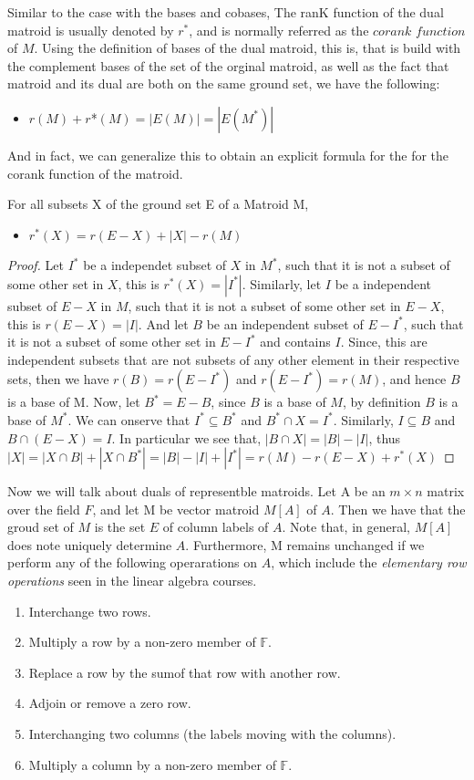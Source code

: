 Similar to the case with the bases and cobases, The ranK function of the dual matroid is usually denoted by $r^*$, and is normally referred as the $corank$ $function$ of $M$. Using the definition of bases of the dual matroid, this is, that is build with the complement bases of the set of the orginal matroid, as well as the fact that matroid and its dual are both on the same ground set, we have the following:

\begin{itemize}
    \item $r(M) + r$*$(M) = |E(M)|=|E(M^*)|$
\end{itemize}

And in fact, we can generalize this to obtain an explicit formula for the for the corank function of the matroid. 

For all subsets X of the ground set E of a Matroid M,
\begin{itemize}
    \item $r^*(X)=r(E-X)+|X|-r(M)$
\end{itemize}

\begin{proof}
    Let $I^*$ be a independet subset of $X$ in $M^*$, such that it is not a subset of some other set in $X$, this is $r^*(X)=|I^*|$. Similarly, let $I$ be a independent subset of $E-X$ in $M$, such that it is not a subset of some other set in $E-X$, this is $r(E-X)=|I|$. And let $B$ be an independent subset of $E-I^*$, such that it is not a subset of some other set in $E-I^*$ and contains $I$. Since, this are independent subsets that are not subsets of any other element in their respective sets, then we have $r(B)=r(E-I^*)$ and $r(E-I^*)=r(M)$, and hence $B$ is a base of M.
    Now, let $B^*=E-B$, since $B$ is a base of $M$, by definition $B$ is a base of $M^*$. We can onserve that $I^*\subseteq B^*$ and  $B^*\cap X=I^*$. Similarly, $I\subseteq B$ and  $B\cap (E-X)=I$. In particular we see that, $|B\cap X|=|B|-|I|$, thus
    $|X|=|X\cap B|+|X\cap B^*|=|B|-|I|+|I^*|=r(M)-r(E-X)+r^*(X)$
\end{proof}


Now we will talk about duals of representble matroids.
Let A be an $m \times n$ matrix over the field $F$, and let M be vector matroid $M[A]$ of $A$. Then we have that the groud set of $M$ is the set $E$ of column labels of $A$. Note that, in general, $M[A]$ does note uniquely determine $A$. Furthermore, M remains unchanged if we perform any of the following operarations on $A$, which include the \textit{elementary row operations} seen in the linear algebra courses.
\begin{enumerate}
    \item Interchange two rows.
    \item Multiply a row by a non-zero member of $\mathbb{F}$.
    \item Replace a row by the sumof that row with another row.
    \item Adjoin or remove a zero row.
    \item Interchanging two columns (the labels moving with the columns).
    \item Multiply a column by a non-zero member of $\mathbb{F}$.
\end{enumerate}

